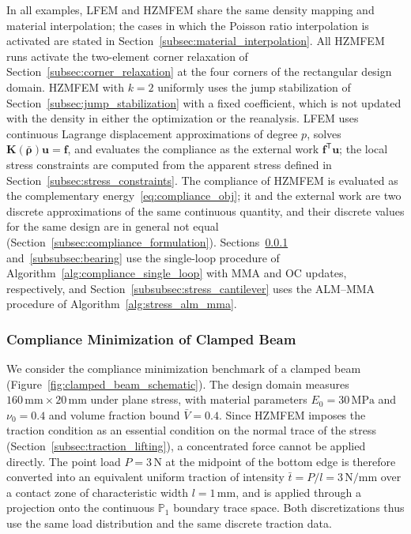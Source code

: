 In all examples, LFEM and HZMFEM share the same density mapping and material interpolation; the cases in which the Poisson ratio interpolation is activated are stated in Section~\ref{subsec:material_interpolation}. All HZMFEM runs activate the two-element corner relaxation of Section~\ref{subsec:corner_relaxation} at the four corners of the rectangular design domain. HZMFEM with $k=2$ uniformly uses the jump stabilization of Section~\ref{subsec:jump_stabilization} with a fixed coefficient, which is not updated with the density in either the optimization or the reanalysis. LFEM uses continuous Lagrange displacement approximations of degree $p$, solves $\boldsymbol{K}(\bar{\boldsymbol{\rho}})\boldsymbol{u}=\boldsymbol{f}$, and evaluates the compliance as the external work $\boldsymbol{f}^{\mathsf T}\boldsymbol{u}$; the local stress constraints are computed from the apparent stress defined in Section~\ref{subsec:stress_constraints}. The compliance of HZMFEM is evaluated as the complementary energy~\eqref{eq:compliance_obj}; it and the external work are two discrete approximations of the same continuous quantity, and their discrete values for the same design are in general not equal (Section~\ref{subsec:compliance_formulation}). Sections~\ref{subsubsec:clamped_beam} and~\ref{subsubsec:bearing} use the single-loop procedure of Algorithm~\ref{alg:compliance_single_loop} with MMA and OC updates, respectively, and Section~\ref{subsubsec:stress_cantilever} uses the ALM--MMA procedure of Algorithm~\ref{alg:stress_alm_mma}.

\subsubsection{Compliance Minimization of Clamped Beam}
\label{subsubsec:clamped_beam}

We consider the compliance minimization benchmark of a clamped beam (Figure~\ref{fig:clamped_beam_schematic}). The design domain measures $160\,\mathrm{mm}\times20\,\mathrm{mm}$ under plane stress, with material parameters $E_0=30\,\mathrm{MPa}$ and $\nu_0=0.4$ and volume fraction bound $\bar{V}=0.4$. Since HZMFEM imposes the traction condition as an essential condition on the normal trace of the stress (Section~\ref{subsec:traction_lifting}), a concentrated force cannot be applied directly. The point load $P=3\,\mathrm{N}$ at the midpoint of the bottom edge is therefore converted into an equivalent uniform traction of intensity $\bar{t}=P/l=3\,\mathrm{N/mm}$ over a contact zone of characteristic width $l=1\,\mathrm{mm}$, and is applied through a projection onto the continuous $\mathbb{P}_1$ boundary trace space. Both discretizations thus use the same load distribution and the same discrete traction data.

